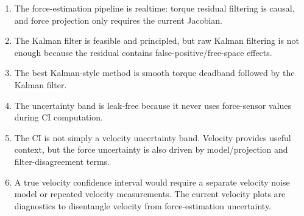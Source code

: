 \documentclass[11pt]{article}
\begin{document}
\begin{enumerate}
\item The force-estimation pipeline is realtime: torque residual filtering is
causal, and force projection only requires the current Jacobian.
\item The Kalman filter is feasible and principled, but raw Kalman filtering is
not enough because the residual contains false-positive/free-space effects.
\item The best Kalman-style method is smooth torque deadband followed by the
Kalman filter.
\item The uncertainty band is leak-free because it never uses force-sensor
values during CI computation.
\item The CI is not simply a velocity uncertainty band. Velocity provides useful
context, but the force uncertainty is also driven by model/projection and
filter-disagreement terms.
\item A true velocity confidence interval would require a separate velocity
noise model or repeated velocity measurements. The current velocity plots are
diagnostics to disentangle velocity from force-estimation uncertainty.
\end{enumerate}
\end{document}

